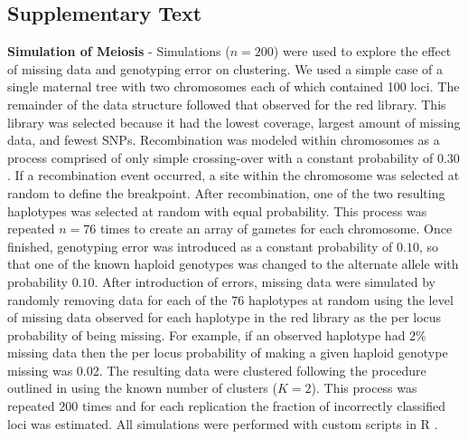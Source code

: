 \documentclass[11pt]{article}
\begin{document}
\subsection*{Supplementary Text}

\textbf{Simulation of Meiosis} - Simulations ($n = 200$) were used to explore 
the effect of missing data and genotyping error on clustering. We 
used a simple case of a single maternal tree with two chromosomes each of which contained 100 loci.
The remainder of the data structure followed that observed for the red library. This library was selected
because it had the lowest coverage, largest amount of missing data, and fewest SNPs.
Recombination was modeled within chromosomes as a process comprised of only simple crossing-over 
with a constant probability of $0.30$. If a recombination event occurred, a site within the chromosome
was selected at random to define the breakpoint. After recombination, one of the two resulting haplotypes was
selected at random with equal probability. This process was repeated $n = 76$ times to create
an array of gametes for each chromosome. Once finished, genotyping error was introduced as a constant
probability of $0.10$, so that one of the known haploid genotypes was changed to the alternate allele with probability $0.10$. 
After introduction of errors, missing data were simulated by randomly removing data for each
of the 76 haplotypes at random using the level of missing data observed for each haplotype in the red library
as the per locus probability of being missing. For example, if an observed haplotype had $2\%$ missing data
then the per locus probability of making a given haploid genotype missing was 0.02. The resulting data were
clustered following the procedure outlined in  using the known number of clusters ($K = 2$).
This process was repeated $200$ times and for each replication the fraction of incorrectly classified loci was
estimated. All simulations were performed with custom scripts in R \citep{R:2013}.
\end{document}
